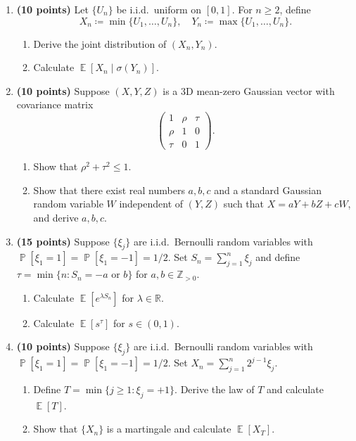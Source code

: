 \documentclass[11pt,a4paper]{article}
\DeclareMathOperator{\E}{\mathbb{E}}
\DeclareMathOperator{\Pbb}{\mathbb{P}}
\begin{document}
\begin{enumerate}[label=\textbf{\arabic*.}]
    \item \textbf{(10 points)} Let $\{U_n\}$ be i.i.d.\ uniform on $[0, 1]$. For $n \ge 2$, define
    \[
    X_n \coloneqq \min\{U_1, \dots, U_n\}, \quad Y_n \coloneqq \max\{U_1, \dots, U_n\}.
    \]
    \begin{enumerate}[label=(\arabic*)]
        \item Derive the joint distribution of $(X_n, Y_n)$.
        \item Calculate $\E [X_n \mid \sigma(Y_n)]$.
    \end{enumerate}

    \item \textbf{(10 points)} Suppose $(X, Y, Z)$ is a 3D mean-zero Gaussian vector with covariance matrix
    \[
    \begin{pmatrix} 1 & \rho & \tau \\ \rho & 1 & 0 \\ \tau & 0 & 1 \end{pmatrix}.
    \]
    \begin{enumerate}[label=(\arabic*)]
        \item Show that $\rho^2 + \tau^2 \le 1$.
        \item Show that there exist real numbers $a, b, c$ and a standard Gaussian random variable $W$ independent of $(Y, Z)$ such that $X = aY + bZ + cW$, and derive $a, b, c$.
    \end{enumerate}

    \item \textbf{(15 points)} Suppose $\{\xi_j\}$ are i.i.d.\ Bernoulli random variables with $\Pbb[\xi_1 = 1] = \Pbb[\xi_1 = -1] = 1/2$. Set $S_n = \sum_{j=1}^n \xi_j$ and define $\tau = \min\{n : S_n = -a \text{ or } b\}$ for $a, b \in \mathbb{Z}_{>0}$.
    \begin{enumerate}[label=(\arabic*)]
        \item Calculate $\E[e^{\lambda S_n}]$ for $\lambda \in \mathbb{R}$.
        \item Calculate $\E[s^\tau]$ for $s \in (0, 1)$.
    \end{enumerate}

    \item \textbf{(10 points)} Suppose $\{\xi_j\}$ are i.i.d.\ Bernoulli random variables with $\Pbb[\xi_1 = 1] = \Pbb[\xi_1 = -1] = 1/2$. Set $X_n = \sum_{j=1}^n 2^{j-1} \xi_j$.
    \begin{enumerate}[label=(\arabic*)]
        \item Define $T = \min\{j \ge 1 : \xi_j = +1\}$. Derive the law of $T$ and calculate $\E[T]$.
        \item Show that $\{X_n\}$ is a martingale and calculate $\E[X_T]$.
    \end{enumerate}


\end{enumerate}
\end{document}

